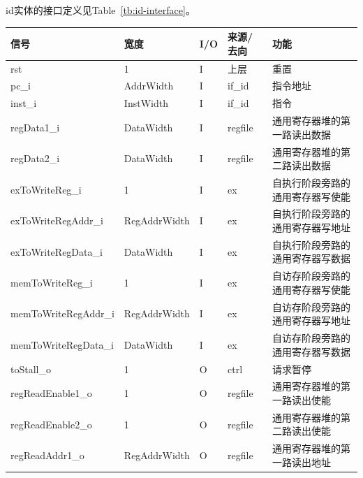 \documentclass{article}
\begin{document}
\begin{spacing}{1.4}
id实体的接口定义见Table~\ref{tb:id-interface}。
\begin{table}[!htb]
\begin{center}
\begin{tabular*}{17cm}{l|l|l|l|p{5cm}}
\hline
\textbf{信号}&\textbf{宽度}&\textbf{I/O}&\textbf{来源/去向}&\textbf{功能} \\
\hline rst                     & 1                      & I     & 上层          & 重置 \\
\hline pc\_i                   & AddrWidth              & I     & if\_id        & 指令地址 \\
\hline inst\_i                 & InstWidth              & I     & if\_id        & 指令 \\
\hline regData1\_i             & DataWidth              & I     & regfile       & 通用寄存器堆的第一路读出数据 \\
\hline regData2\_i             & DataWidth              & I     & regfile       & 通用寄存器堆的第二路读出数据 \\
\hline exToWriteReg\_i         & 1                      & I     & ex            & 自执行阶段旁路的通用寄存器写使能 \\
\hline exToWriteRegAddr\_i     & RegAddrWidth           & I     & ex            & 自执行阶段旁路的通用寄存器写地址 \\
\hline exToWriteRegData\_i     & DataWidth              & I     & ex            & 自执行阶段旁路的通用寄存器写数据 \\
\hline memToWriteReg\_i        & 1                      & I     & ex            & 自访存阶段旁路的通用寄存器写使能 \\
\hline memToWriteRegAddr\_i    & RegAddrWidth           & I     & ex            & 自访存阶段旁路的通用寄存器写地址 \\
\hline memToWriteRegData\_i    & DataWidth              & I     & ex            & 自访存阶段旁路的通用寄存器写数据 \\
\hline toStall\_o              & 1                      & O     & ctrl          & 请求暂停 \\
\hline regReadEnable1\_o       & 1                      & O     & regfile       & 通用寄存器堆的第一路读出使能 \\
\hline regReadEnable2\_o       & 1                      & O     & regfile       & 通用寄存器堆的第二路读出使能 \\
\hline regReadAddr1\_o         & RegAddrWidth           & O     & regfile       & 通用寄存器堆的第一路读出地址 \\

\end{tabular*}
\end{center}
\end{table}
\end{spacing}
\end{document}
